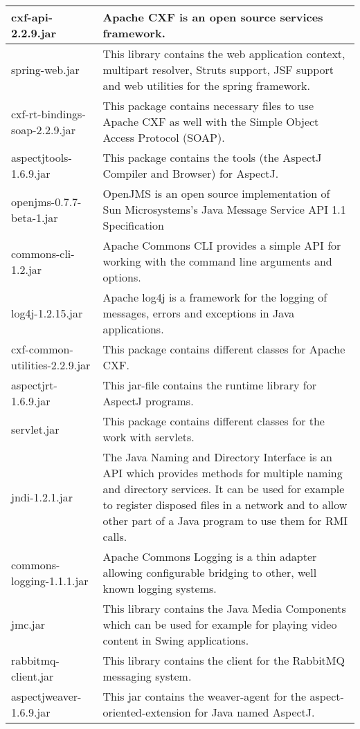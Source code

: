 \begin{center}
\begin{longtable}{|p{}|p{}|}
\hline 
cxf-api-2.2.9.jar & Apache CXF is an open source services framework.  \\
\hline 
spring-web.jar & This library contains the web application context, multipart resolver, Struts support, JSF support and web utilities for the spring framework.\\
\hline 
cxf-rt-bindings-soap-2.2.9.jar & This package contains necessary files to use Apache CXF as well with the Simple Object Access Protocol (SOAP).\\
\hline 
aspectjtools-1.6.9.jar & This package contains the tools (the AspectJ Compiler and Browser) for AspectJ.\\
\hline 
openjms-0.7.7-beta-1.jar & OpenJMS is an open source implementation of Sun Microsystems's Java Message Service API 1.1 Specification\\
\hline 
commons-cli-1.2.jar & Apache Commons CLI provides a simple API for working with the command line arguments and options.\\
\hline 
log4j-1.2.15.jar & Apache log4j is a framework for the logging of messages, errors and exceptions in Java applications.\\
\hline 
cxf-common-utilities-2.2.9.jar & This package contains different classes for Apache CXF.\\
\hline 
aspectjrt-1.6.9.jar & This jar-file contains the runtime library for AspectJ programs.\\
\hline 
servlet.jar & This package contains different classes for the work with servlets.\\
\hline 
jndi-1.2.1.jar & The Java Naming and Directory Interface is an API which provides methods for multiple naming and directory services. It can be used for example to register disposed files in a network and to allow other part of a Java program to use them for RMI calls.\\
\hline 
commons-logging-1.1.1.jar & Apache Commons Logging is a thin adapter allowing configurable bridging to other, well known logging systems.\\
\hline 
jmc.jar & This library contains the Java Media Components which can be used for example for playing video content in Swing applications.\\
\hline 
rabbitmq-client.jar & This library contains the client for the RabbitMQ messaging system.\\
\hline 
aspectjweaver-1.6.9.jar & This jar contains the weaver-agent for the aspect-oriented-extension for Java named AspectJ.\\
\hline 
\end{longtable}
\label{tabular:libraries}
\end{center}
